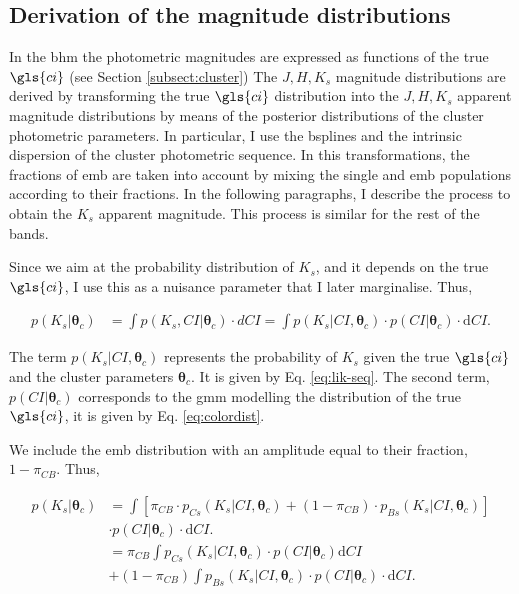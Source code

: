 \subsection{Derivation of the magnitude distributions}
\label{subsect:deriveluminosity}

In the \gls{bhm} the photometric magnitudes are expressed as functions of the true $\gls{ci}$ (see Section \ref{subsect:cluster})
The $J,H,K_s$ magnitude distributions are derived by transforming the true $\gls{ci}$ distribution into the $J,H,K_s$ apparent magnitude distributions by means of the posterior distributions of the cluster photometric parameters. In particular, I use the \glspl{bspline} and the intrinsic dispersion of the cluster photometric sequence. In this transformations, the fractions of \gls{emb} are taken into account by mixing the single and \gls{emb} populations according to their fractions. In the following paragraphs, I describe the process to obtain the $K_s$ apparent magnitude. This process is similar for the rest of the bands. 

Since we aim at the probability distribution of $K_s$, and it depends on the true $\gls{ci}$, I use this as a nuisance parameter that I later marginalise. Thus, 

\begin{align}
p(K_s | \boldsymbol{\theta}_c) & = \int p(K_s,CI | \boldsymbol{\theta}_c) \cdot dCI =  \int p(K_s | CI ,\boldsymbol{\theta}_c) \cdot p(CI|\boldsymbol{\theta}_c)\cdot \mathrm{d}CI. \nonumber
\end{align}

The term $p(K_s | CI ,\boldsymbol{\theta}_c)$ represents the probability of $K_s$ given the true $\gls{ci}$ and the cluster parameters $\boldsymbol{\theta}_c$. It is given by Eq. \ref{eq:lik-seq}. The second term, $p(CI|\boldsymbol{\theta}_c)$ corresponds to the \gls{gmm} modelling the distribution of the true $\gls{ci}$, it is given by Eq. \ref{eq:colordist}. 

We include the \gls{emb}  distribution with an amplitude equal to their fraction, $1-\pi_{CB}$. Thus,

\begin{align}
p(K_s | \boldsymbol{\theta}_c) & =  \int \left[\pi_{CB}\cdot p_{Cs}(K_s| CI, \boldsymbol{\theta}_c) + (1-\pi_{CB})\cdot p_{Bs}(K_s| CI, \boldsymbol{\theta}_c)\right]\nonumber \\& \cdot p(CI|\boldsymbol{\theta}_c)\cdot \mathrm{d}CI. \nonumber \\
& =   \pi_{CB} \int p_{Cs}(K_s| CI, \boldsymbol{\theta}_c) \cdot p(CI|\boldsymbol{\theta}_c) \mathrm{d}CI \nonumber \\
&+ (1-\pi_{CB})\int p_{Bs}(K_s| CI, \boldsymbol{\theta}_c) \cdot p(CI|\boldsymbol{\theta}_c)\cdot  \mathrm{d}CI. \nonumber \\
\end{align}

